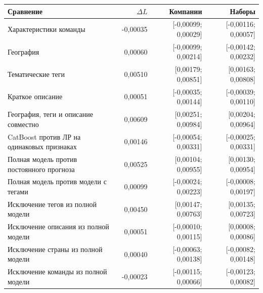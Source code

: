 \begin{tabular}{@{}>{\raggedright\arraybackslash}p{6.0cm}rrr@{}}
\toprule
Сравнение & $\Delta L$ & Компании & Наборы \\
\midrule
Характеристики команды & -0,00035 & [-0,00099; 0,00029] & [-0,00116; 0,00057] \\
География & 0,00060 & [-0,00099; 0,00214] & [-0,00142; 0,00232] \\
Тематические теги & 0,00510 & [0,00179; 0,00851] & [0,00163; 0,00808] \\
Краткое описание & 0,00051 & [-0,00035; 0,00144] & [-0,00039; 0,00110] \\
География, теги и описание совместно & 0,00609 & [0,00251; 0,00984] & [0,00204; 0,00964] \\
CatBoost против ЛР на одинаковых признаках & 0,00146 & [-0,00054; 0,00331] & [-0,00025; 0,00331] \\
Полная модель против постоянного прогноза & 0,00525 & [0,00104; 0,00955] & [0,00130; 0,00954] \\
Полная модель против модели с тегами & 0,00099 & [-0,00024; 0,00223] & [-0,00008; 0,00197] \\
Исключение тегов из полной модели & 0,00450 & [0,00147; 0,00763] & [0,00135; 0,00723] \\
Исключение описания из полной модели & 0,00051 & [-0,00010; 0,00115] & [0,00008; 0,00086] \\
Исключение страны из полной модели & 0,00040 & [-0,00063; 0,00138] & [-0,00082; 0,00148] \\
Исключение команды из полной модели & -0,00023 & [-0,00115; 0,00066] & [-0,00123; 0,00082] \\
\bottomrule
\end{tabular}
